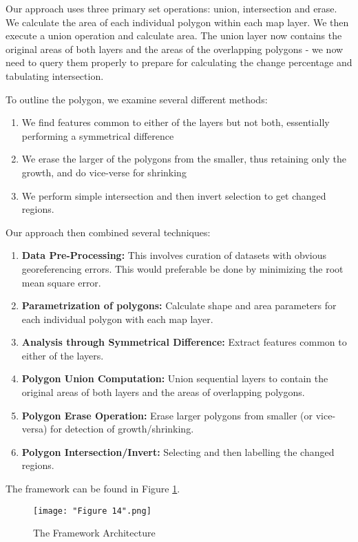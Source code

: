 \documentclass[conference]{IEEEtran}
\begin{document}
Our approach uses three primary set operations: union, intersection and erase. We calculate the area of each individual polygon within each map layer. We then execute a union operation and calculate area. The union layer now contains the original areas of both layers and the areas of the overlapping polygons - we now need to query them properly to prepare for calculating the change percentage and tabulating intersection.

To outline the polygon, we examine several different methods:
\begin{enumerate}
	\item We find features common to either of the layers but not both, essentially performing a symmetrical difference
	\item We erase the larger of the polygons from the smaller, thus retaining only the growth, and do vice-verse for shrinking
	\item We perform simple intersection and then invert selection to get changed regions. 
\end{enumerate}

Our approach then combined several techniques:
\begin{enumerate}
	\item \textbf{Data Pre-Processing:} This involves curation of datasets with obvious georeferencing errors. This would preferable be done by minimizing the root mean square error.
	\item \textbf{Parametrization of polygons:} Calculate shape and area parameters for each individual polygon with each map layer.
	\item \textbf{Analysis through Symmetrical Difference:} Extract features common to either of the layers.
	\item \textbf{Polygon Union Computation:} Union sequential layers to contain the original areas of both layers and the areas of overlapping polygons.
	\item \textbf{Polygon Erase Operation:} Erase larger polygons from smaller (or vice-versa) for detection of growth/shrinking.
	\item \textbf{Polygon Intersection/Invert:} Selecting and then labelling the changed regions.
\end{enumerate}

The framework can be found in Figure \ref{Figure 1}.

\begin{figure}[ht]
\centerline{\texttt{[image: "Figure 14".png]}}
\caption{The Framework Architecture}
\label{Figure 1}
\end{figure}
%
\end{document}
